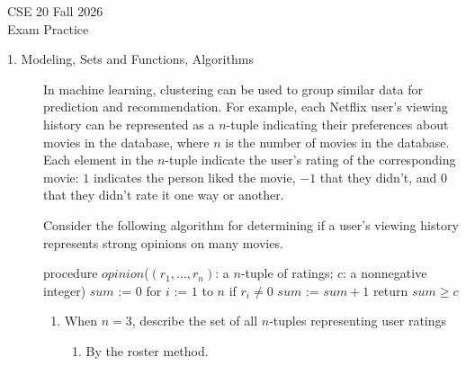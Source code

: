 \documentclass[12pt, oneside]{article}
\author{CSE020F26}
\newif \ifsolution
\newcommand{\sol}[1]{\medskip\fbox{\begin{minipage}{5.5in}{#1}\end{minipage}}\medskip}
\begin{document}
\begin{center}
{\Large
CSE 20 Fall 2026\\ 
Exam Practice \ifsolution{\qquad Solutions}\fi}
\end{center}

\thispagestyle{empty}

\ifsolution{}
\else{}
\fi

\begin{description}

\item[1. Modeling, Sets and Functions, Algorithms] 
In machine learning, clustering can be used to group similar data for prediction and recommendation.  For example,
each Netflix user's viewing history can be represented as a $n$-tuple indicating their preferences about
movies in the database, where $n$ is the number of movies in the database.  Each element in the $n$-tuple indicate
the user's rating of the corresponding movie: 
$1$ indicates the person liked the movie, $-1$
that they didn't, and $0$ that they didn't rate it one way or another.

Consider the following algorithm for determining if a user's viewing history represents
strong opinions on many movies.
\begin{algorithm}[caption={Determine if user's ratings tuple encode strong opinions}]
procedure $\textit{opinion}$($(r_1, \ldots, r_n)$: a $n$-tuple of ratings; $c$: a nonnegative integer)
$sum$ := $0$
for $i$ := $1$ to $n$
  if $r_i \neq 0$
    $sum$ := $sum + 1$
return $sum \geq c$
\end{algorithm}

  \begin{enumerate}\item When $n = 3$, describe the set of all $n$-tuples representing user ratings
  \begin{enumerate}\item By the roster method.
  
  \ifsolution{
  \sol{There are 27 $3$-tuples whose elements are each $-1$, $0$, or $1$.  We can list them as follows.
  \begin{align*}
  \{ & (-1, -1, -1) , (-1, -1, 0) , (-1, -1, 1) , (-1, 0, -1), (-1, 0, 0), (-1, 0, 1),\\
     & (-1, 1, -1), (-1, 1, 0), (-1, 1, 1), (0, -1, -1) , (0, -1, 0) , (0, -1, 1) , \\
     & (0, 0, -1), (0, 0, 0), (0, 0, 1), (0, 1, -1), (0, 1, 0), (0, 1, 1), (1, -1, -1) , \\
     & (1, -1, 0) , (1, -1, 1) , (1, 0, -1), (1, 0, 0), (1, 0, 1), (1, 1, -1), (1, 1, 0), (1, 1, 1) \}  
  \end{align*}
  }}\fi
  

\end{enumerate}
\end{enumerate}
\end{description}
\end{document}
